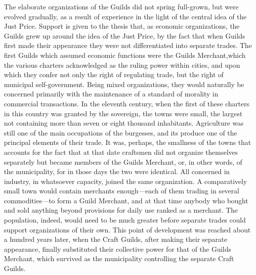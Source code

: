 \documentclass{book}
\begin{document}
The elaborate organizations of the Guilds did not spring full-grown, but were evolved gradually, as a result of experience in the light of the central idea of the Just Price. Support is given to the thesis that, as economic organizations, the Guilds grew up around the idea of the Just Price, by the fact that when Guilds first made their appearance they were not differentiated into separate trades. The first Guilds which assumed economic functions were the Guilds Merchant,\footnotemark[5] which the various charters acknowledged as the ruling power within cities, and upon which they confer not only the right of regulating trade, but the right of municipal self-government. Being mixed organizations, they would naturally be concerned primarily with the maintenance of a standard of morality in commercial transactions. In the eleventh century, when the first of these charters in this country was granted by the sovereign, the towns were small, the largest not containing more than seven or eight thousand inhabitants. Agriculture was still one of the main occupations of the burgesses, and its produce one of the principal elements of their trade. It was, perhaps, the smallness of the towns that accounts for the fact that at that date craftsmen did not organize themselves separately but became members of the Guilds Merchant, or, in other words, of the municipality, for in those days the two were identical. All concerned in industry, in whatsoever capacity, joined the same organization. A comparatively small town would contain merchants enough—each of them trading in several commodities—to form a Guild Merchant, and at that time anybody who bought and sold anything beyond provisions for daily use ranked as a merchant. The population, indeed, would need to be much greater before separate trades could support organizations of their own. This point of development was reached about a hundred years later, when the Craft Guilds, after making their separate appearance, finally substituted their collective power for that of the Guilds Merchant, which survived as the municipality controlling the separate Craft Guilds.
\end{document}
